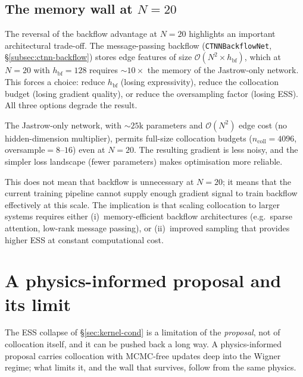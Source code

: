 \subsection{The memory wall at $N{=}20$}
\label{sec:colloc-arch-discussion}

The reversal of the backflow advantage at $N{=}20$ highlights an
important architectural trade-off.
The message-passing backflow (\texttt{CTNNBackflowNet}, \S\ref{subsec:ctnn-backflow})
stores edge features of size
$\mathcal{O}(N^2 \times h_{\text{bf}})$, which at $N{=}20$ with
$h_{\text{bf}}{=}128$ requires ${\sim}10\times$ the memory of the
Jastrow-only network.
This forces a choice: reduce $h_{\text{bf}}$ (losing expressivity),
reduce the collocation budget (losing gradient quality), or reduce
the oversampling factor (losing ESS).
All three options degrade the result.

The Jastrow-only network, with ${\sim}25$k parameters and
$\mathcal{O}(N^2)$ edge cost (no hidden-dimension multiplier),
permits full-size collocation budgets ($n_{\text{coll}}{=}4096$,
oversample${=}8$--$16$) even at $N{=}20$.
The resulting gradient is less noisy, and the simpler loss landscape
(fewer parameters) makes optimisation more reliable.

This does not mean that backflow is unnecessary at $N{=}20$; it
means that the current training pipeline cannot supply enough
gradient signal to train backflow effectively at this scale.
The implication is that scaling collocation to larger systems
requires either (i)~memory-efficient backflow architectures
(e.g.\ sparse attention, low-rank message passing), or
(ii)~improved sampling that provides higher ESS at constant
computational cost.

\section{A physics-informed proposal and its limit}
\label{sec:kernel-q3-frontier}

The ESS collapse of \S\ref{sec:kernel-cond} is a limitation of the \emph{proposal}, not
of collocation itself, and it can be pushed back a long way. A physics-informed proposal
carries collocation with MCMC-free updates deep into the Wigner regime; what limits it, and the wall
that survives, follow from the same physics.

